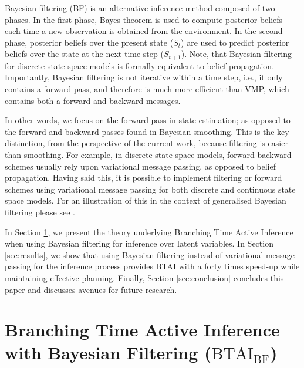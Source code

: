 \documentclass[twoside,11pt]{article}
\begin{document}
Bayesian filtering (BF) \citep{BAYESIAN_FILTERING} is an alternative inference method composed of two phases. In the first phase, Bayes theorem is used to compute posterior beliefs each time a new observation is obtained from the environment. In the second phase, posterior beliefs over the present state ($S_t$) are used to predict posterior beliefs over the state at the next time step ($S_{t+1}$). Note, that Bayesian filtering for discrete state space models is formally equivalent to belief propagation. Importantly, Bayesian filtering is not iterative within a time step, i.e., it only contains a forward pass, and therefore is much more efficient than VMP, which contains both a forward and backward messages.

In other words, we focus on the forward pass in state estimation; as opposed to the forward and backward passes found in Bayesian smoothing. This is the key distinction, from the perspective of the current work, because filtering is easier than smoothing. For example, in discrete state space models, forward-backward schemes usually rely upon variational message passing, as opposed to belief propagation. Having said this, it is possible to implement filtering or forward schemes using variational message passing for both discrete and continuous state space models. For an illustration of this in the context of generalised Bayesian filtering please see \citep{believe}.

In Section \ref{sec:ai_ts}, we present the theory underlying Branching Time Active Inference when using Bayesian filtering for inference over latent variables. In Section \ref{sec:results}, we show that using Bayesian filtering instead of variational message passing for the inference process provides BTAI with a forty times speed-up while maintaining effective planning. Finally, Section \ref{sec:conclusion} concludes this paper and discusses avenues for future research.

\section{Branching Time Active Inference with Bayesian Filtering ($\text{BTAI}_{\text{BF}}$)} \label{sec:ai_ts}
\end{document}
